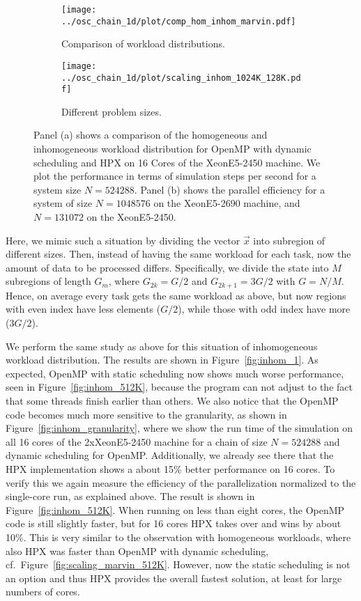 \documentclass[10pt]{elsarticle}
\begin{document}
\begin{figure}
 \begin{subfigure}[b]{0.49\textwidth}
  \centering
  \texttt{[image: ../osc\_chain\_1d/plot/comp\_hom\_inhom\_marvin.pdf]}
  \caption{Comparison of workload distributions.} 
  \label{fig:comp_hom_inhom_marvin}
 \end{subfigure}
 \begin{subfigure}[b]{0.51\textwidth}
  \centering
  \texttt{[image: ../osc\_chain\_1d/plot/scaling\_inhom\_1024K\_128K.pdf]}
  \caption{Different problem sizes.} 
  \label{fig:inhom_1024K}
 \end{subfigure}
 \caption{Panel (a) shows a comparison of the homogeneous and inhomogeneous workload distribution for OpenMP with dynamic scheduling and HPX on 16 Cores of the XeonE5-2450 machine. We plot the performance in terms of simulation steps per second for a system size $N=524288$. Panel (b) shows the parallel efficiency for a system of size $N=1048576$ on the XeonE5-2690 machine, and $N=131072$ on the XeonE5-2450.}
 \label{fig:inhom_2}
\end{figure}

Here, we mimic such a situation by dividing the vector $\vec x$ into subregion of different sizes.
Then, instead of having the same workload for each task, now the amount of data to be processed differs.
Specifically, we divide the state into $M$ subregions of length $G_m$, where $G_{2k}=G/2$ and $G_{2k+1}=3G/2$ with $G=N/M$.
Hence, on average every task gets the same workload as above, but now regions with even index have less elements ($G/2$), while those with odd index have more ($3G/2$).

We perform the same study as above for this situation of inhomogeneous workload distribution.
The results are shown in Figure~\ref{fig:inhom_1}.
As expected, OpenMP with static scheduling now shows much worse performance, seen in Figure~\ref{fig:inhom_512K}, because the program can not adjust to the fact that some threads finish earlier than others.
We also notice that the OpenMP code becomes much more sensitive to the granularity, as shown in Figure~\ref{fig:inhom_granularity}, where we show the run time of the simulation on all 16 cores of the  2xXeonE5-2450 machine for a chain of size $N=524288$ and dynamic scheduling for OpenMP.
Additionally, we already see there that the HPX implementation shows a about 15\% better performance on 16 cores.
To verify this we again measure the efficiency of the parallelization normalized to the single-core run, as explained above.
The result is shown in Figure~\ref{fig:inhom_512K}.
When running on less than eight cores, the OpenMP code is still slightly faster, but for 16 cores HPX takes over and wins by about 10\%.
This is very similar to the observation with homogeneous workloads, where also HPX was faster than OpenMP with dynamic scheduling, cf.\ Figure~\ref{fig:scaling_marvin_512K}.
However, now the static scheduling is not an option and thus HPX provides the overall fastest solution, at least for large numbers of cores.
\end{document}
